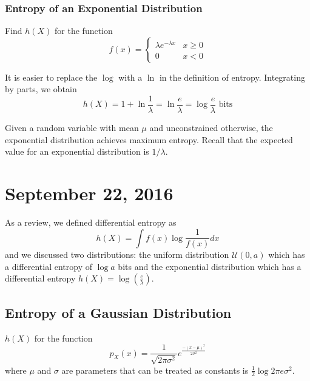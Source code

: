 \documentclass[11pt]{article}
\theoremstyle{definition}
\begin{document}
\subsubsection{Entropy of an Exponential Distribution}

\example Find $h(X)$ for the function 
\begin{equation*} f(x) =	 \begin{cases}
								\lambda e^{-\lambda x} & x \geq 0\\
								0 & x < 0 
							\end{cases}
\end{equation*}

\noindent It is easier to replace the $\log$ with a $\ln$ in the definition of entropy. Integrating by parts, we obtain $$h(X) = 1 + \ln \frac{1}{\lambda} = \ln \frac{e}{\lambda} = \log \frac{e}{\lambda} \text{ bits} $$

\theorem Given a random variable with mean $\mu$ and unconstrained otherwise, the exponential distribution achieves maximum entropy. Recall that the expected value for an exponential distribution is $1/\lambda$. 
\section{September 22, 2016}

As a review, we defined differential entropy as $$h(X) = \int f(x) \log \frac{1}{f(x)} dx$$and we discussed two distributions: the uniform distribution $\mathcal{U}(0, a)$ which has a differential entropy of $\log a$ bits and the exponential distribution which has a differential entropy $h	(X) = \log (\frac{e}{\lambda})$. 

\subsection{Entropy of a Gaussian Distribution}

\theorem $h(X)$ for the function 
\begin{equation*}
p_X(x) = \frac{1}{\sqrt{2\pi\sigma^2}}e^{\frac{-(x - \mu)^2}{2\sigma^2}}
\end{equation*}
where $\mu$ and $\sigma$ are parameters that can be treated as constants is $\frac{1}{2} \log 2 \pi e \sigma^2$.
\end{document}
